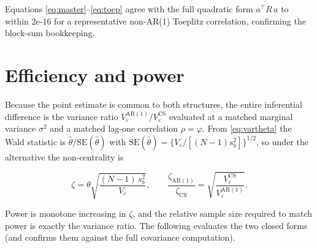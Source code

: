\documentclass[
  11pt,
]{article}
\begin{document}
Equations \eqref{eq:master}--\eqref{eq:toep} agree with the full
quadratic form \(a^\top R\, a\) to within
2e-16 for a representative non-AR(1) Toeplitz
correlation, confirming the block-sum bookkeeping.

\section{Efficiency and power}\label{efficiency-and-power}

Because the point estimate is common to both structures, the entire
inferential difference is the variance ratio
\(V_\varepsilon^{\mathrm{AR}(1)} / V_\varepsilon^{\mathrm{CS}}\)
evaluated at a matched marginal variance \(\sigma^2\) and a matched
lag-one correlation \(\rho = \varphi\). From \eqref{eq:vartheta} the
Wald statistic is \(\hat\theta / \mathrm{SE}(\hat\theta)\) with
\(\mathrm{SE}(\hat\theta) = \{V_\varepsilon / [(N-1)s_b^2]\}^{1/2}\), so
under the alternative the non-centrality is

\begin{equation}
\zeta = \theta \sqrt{\frac{(N-1)\, s_b^2}{V_\varepsilon}},
\qquad
\frac{\zeta_{\mathrm{AR}(1)}}{\zeta_{\mathrm{CS}}}
  = \sqrt{\frac{V_\varepsilon^{\mathrm{CS}}}
               {V_\varepsilon^{\mathrm{AR}(1)}}} .
\label{eq:ncp}
\end{equation}

Power is monotone increasing in \(\zeta\), and the relative sample size
required to match power is exactly the variance ratio. The following
evaluates the two closed forms (and confirms them against the full
covariance computation).
\end{document}
